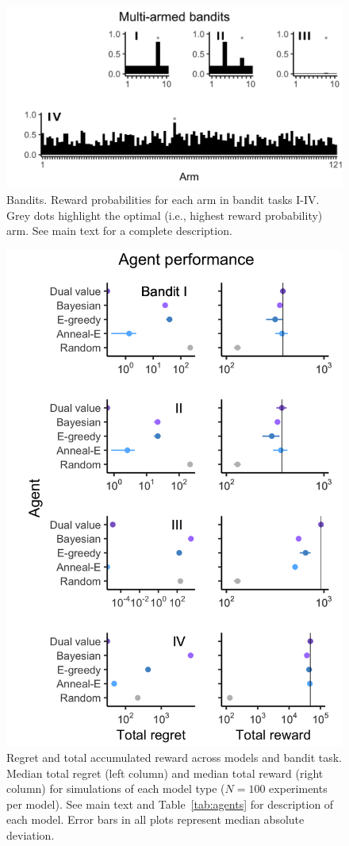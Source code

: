 \documentclass[9pt,twocolumn,twoside]{pnas-new}
\begin{document}
\begin{figure}
	[tbhp] \centering 
	\includegraphics[width=.95\linewidth]{figures/fig2.png} 
	\caption{ \label{fig:f2} Bandits. Reward probabilities for each arm in bandit tasks I-IV. Grey dots highlight the optimal (i.e., highest reward probability) arm. See main text for a complete description.} 
\end{figure}

\begin{figure}
	[tbhp] \centering 
	\includegraphics[width=.75\linewidth]{figures/fig3.png} 
	\caption{ \label{fig:f3} Regret and total accumulated reward across models and bandit task. Median total regret (left column) and median total reward (right column) for simulations of each model type ($N=100$ experiments per model). See main text and Table~\ref{tab:agents} for description of each model. Error bars in all plots represent median absolute deviation.} 
\end{figure}
\end{document}
